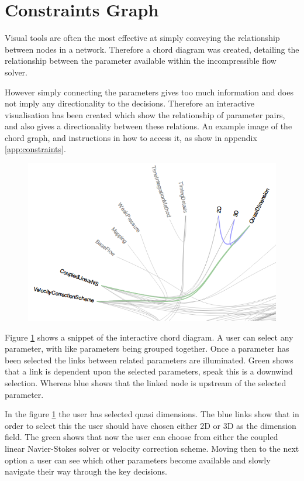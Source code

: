 \documentclass[11pt, a4paper]{report}
\begin{document}
\section{Constraints Graph}
\label{sec:constraint_graph}
Visual tools are often the most effective at simply conveying the relationship between nodes in a network. Therefore a chord diagram was created, detailing the relationship between the parameter available within the incompressible flow solver. 

However simply connecting the parameters gives too much information and does not imply any directionality to the decisions. Therefore an interactive visualisation has been created which show the relationship of parameter pairs, and also gives a directionality between these relations. An example image of the chord graph, and instructions in how to access it, as show in appendix \ref{app:constraints}.

\begin{figure}[htb!]
 \centering
 \includegraphics[width=.95\linewidth,  clip=true, trim = 0cm 0cm 0cm 0cm]{constraint_directionality}
 \label{fig:constrain_directionality}
\end{figure}

Figure \ref{fig:constrain_directionality} shows a snippet of the interactive chord diagram. A user can select any parameter, with like parameters being grouped together. Once a parameter has been selected the links between related parameters are illuminated. Green shows that a link is dependent upon the selected parameters, speak this is a downwind selection. Whereas blue shows that the linked node is upstream of the selected parameter.

In the figure \ref{fig:constrain_directionality} the user has selected quasi dimensions. The blue links show that in order to select this the user should have chosen either 2D or 3D as the dimension field. The green shows that now the user can choose from either the coupled linear Navier-Stokes solver or velocity correction scheme. Moving then to the next option a user can see which other parameters become available and slowly navigate their way through the key decisions.
\end{document}
